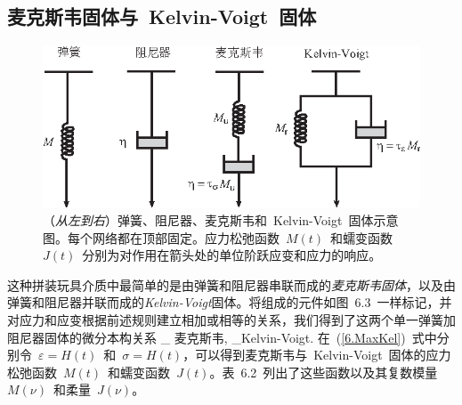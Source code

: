 \subsection{麦克斯韦固体与~Kelvin-Voigt~固体}
%
%

\begin{figure}[!b]
\begin{center}
\includegraphics{../figures/chap06/fig03.eps}
\end{center}
\caption[4 networks]{
（{\em 从左到右\/}）弹簧、阻尼器、麦克斯韦和~Kelvin-Voigt~固体示意图。每个网络都在顶部固定。应力松弛函数~$M(t)$~和蠕变函数~$J(t)$~分别为对作用在箭头处的单位阶跃应变和应力的响应。
}
\end{figure}
这种拼装玩具介质中最简单的是由弹簧和阻尼器串联而成的{\em 麦克斯韦固体\/}，以及由弹簧和阻尼器并联而成的{\em Kelvin-Voigt\/}固体。将组成的元件如图~6.3~一样标记，并对应力和应变根据前述规则建立相加或相等的关系，我们得到了这两个单一弹簧加阻尼器固体的微分本构关系
\eq \label{6.MaxKel}
_
{\mbox{\rm\scriptsize 麦克斯韦}},
\qquad
{}
_{\mbox{\rm\scriptsize Kelvin-Voigt}}.
\en
在~(\ref{6.MaxKel})~式中分别令~$\varepsilon=H(t)$~和~$\sigma=H(t)$，可以得到麦克斯韦与~Kelvin-Voigt~固体的应力松弛函数~$M(t)$~和蠕变函数~$J(t)$。表~6.2~列出了这些函数以及其复数模量~$M(\nu)$~和柔量~$J(\nu)$。
